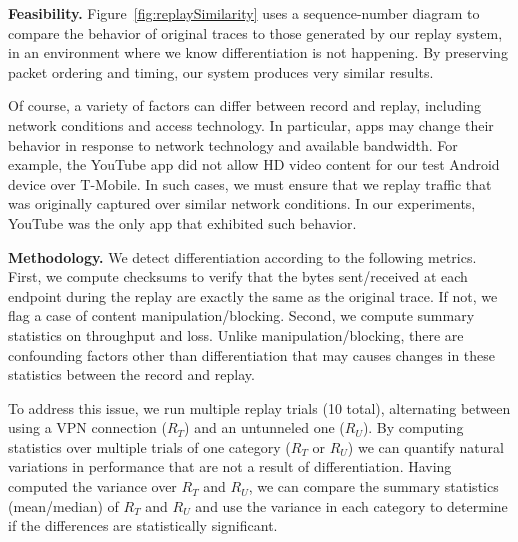 



\noindent\textbf{Feasibility.}
Figure~\ref{fig:replaySimilarity} uses a sequence-number diagram to compare the behavior of original traces 
to those generated by our replay system, in an environment where we know differentiation is not happening. 
By preserving packet ordering and timing, our system produces very similar results. 


Of course, a variety of factors can differ between record and replay, including network 
conditions and access technology. In particular, apps may change their behavior in response 
to network technology and available bandwidth. For example, the YouTube app did not  
allow HD video content for our test Android device over T-Mobile. In such cases, we must ensure that we replay 
traffic that was originally captured over similar network conditions. 
In our experiments, YouTube was the only app that exhibited such behavior.





\noindent\textbf{Methodology.} We detect differentiation according to the following metrics. First, we 
compute checksums to verify that the bytes sent/received at each endpoint during the replay are 
exactly the same as the original trace. If not, we flag a case of content manipulation/blocking. Second, we
compute summary statistics on throughput and loss. Unlike manipulation/blocking, there are 
confounding factors other than differentiation that may causes changes in these statistics between the 
record and replay.

To address this issue, we run multiple replay trials (10 total), alternating between using a VPN connection ($R_T$) and 
an untunneled one ($R_U$). By computing statistics over multiple trials of one category ($R_T$ or $R_U$) we can quantify 
natural variations in performance that are not a result of differentiation. Having computed the variance over $R_T$ and $R_U$, we can 
compare the summary statistics (mean/median) of $R_T$ and $R_U$ and use the variance in each category 
to determine if the differences are statistically significant.

